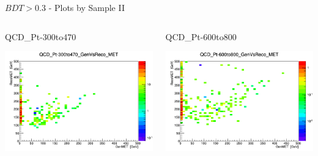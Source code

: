 \documentclass[8pt]{beamer}
\begin{document}
\begin{frame}{$BDT>0.3$ - Plots by Sample II}
\begin{columns}
\begin{block}{QCD\_Pt-300to470}
 
\centering
\includegraphics[width=\linewidth]{img/QCD_Pt-300to470_GenVsReco_MET.png} 
 
\end{block}

\begin{block}{QCD\_Pt-600to800}
 
\centering
\includegraphics[width=\linewidth]{img/QCD_Pt-600to800_GenVsReco_MET.png} 
 
\end{block}


\end{columns} 
 
\end{frame}
\end{document}
